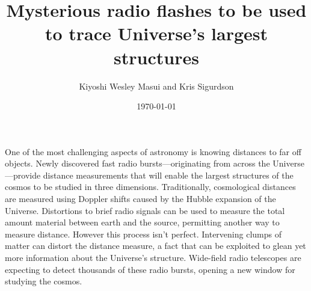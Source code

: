 \documentclass{article}
\title{Mysterious radio flashes to be used to trace Universe's largest
structures}
\date{\today}
\author{Kiyoshi Wesley Masui and Kris Sigurdson}
\begin{document}
\maketitle

One of the most challenging aspects of astronomy is knowing distances to far
off objects. Newly discovered fast radio bursts---originating from across the
Universe---provide distance measurements that will enable the largest
structures of the cosmos to be studied in three dimensions. Traditionally,
cosmological distances are measured using Doppler shifts caused by the Hubble
expansion of the Universe. Distortions to brief radio signals can be used to
measure the total amount material between earth and the source, permitting
another way to measure distance. However this process isn't perfect.
Intervening clumps of matter can distort the distance measure, a fact that can
be exploited to glean yet more information about the Universe's structure.
Wide-field radio telescopes are expecting to detect thousands of these radio
bursts, opening a new window for studying the cosmos.
\end{document}
